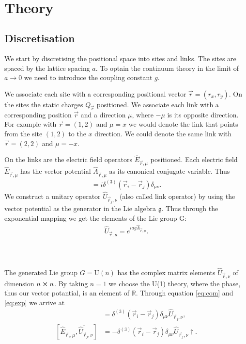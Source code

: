 \,\\[160pt]
\section{Theory}
\subsection{Discretisation}

We start by discretising the positional space into sites and links. The sites are spaced by the lattice spacing $a$. To optain the continuum theory in the limit of $a\rightarrow 0$ we need to introduce the coupling constant $g$\cite{RevModPhys.51.659}.

We associate each site with a corresponding positional vector $\vec{r}=(r_x, r_y)$. On the sites the static charges $Q_{\vec{r}}$ positioned. We associate each link with a corresponding position $\vec{r}$ and a direction $\mu$, where $-\mu$ is its opposite direction. For example with $\vec{r}=(1, 2)$ and $\mu=x$ we would denote the link that points from the site $(1, 2)$ to the $x$ direction. We could denote the same link with $\vec{r}=(2, 2)$ and $\mu=-x$.

On the links are the electric field operators $\hat{E}_{\vec{r},\mu}$ positioned. Each electric field $\hat{E}_{\vec{r}, \mu}$ has the vector potential $\hat{A}_{\vec{r}, \mu}$ as its canonical conjugate variable. Thus
\begin{align}
  [\hat{E}_{\vec{r}_{i}, \mu}, \hat{A}_{\vec{r}_{j}, \nu}]=i\delta^{(3)}(\vec{r}_{i}-\vec{r}_{j})\delta_{\mu\nu}.\label{eq:com}
\end{align}
We construct a unitary operator $\hat{U}_{\vec{r}_{j}, \nu}$ (also called link operator) by using the vector potential as the generator in the Lie algebra $\mathfrak{g}$. Thus through the exponential mapping we get the elements of the Lie group G:
\begin{align}
	\hat{U}_{\vec{r}, \mu} = e^{iag\hat{A}_{\vec{r}, \mu}}.\label{eq:exp}
\end{align}
\\\\
\\[180pt]
The generated Lie group $G=\text{U}(n)$ has the complex matrix elements $\hat{U}_{\vec{r}, \nu}$ of dimension $n\cross n$. By taking $n=1$ we choose the U(1) theory, where the phase, thus our vector potantial, is an element of $\mathbb{R}$. Through equation \ref{eq:com} and \ref{eq:exp} we arrive at
\begin{align}
  [\hat{E}_{\vec{r}_{i}, \mu}, \hat{U}_{\vec{r}_{j}, \nu}]      & =\delta^{(3)}(\vec{r}_{i}-\vec{r}_{j})\delta_{\mu\nu}\hat{U}_{\vec{r}_{j}, \nu},\label{eq:comu1}       \\
  [\hat{E}_{\vec{r}_{i}, \mu}, \hat{U}_{\vec{r}_{j}, \nu}^\dag] & =-\delta^{(3)}(\vec{r}_{i}-\vec{r}_{j})\delta_{\mu\nu}\hat{U}_{\vec{r}_{j}, \nu}\dag. \label{eq:comu2}
\end{align}

